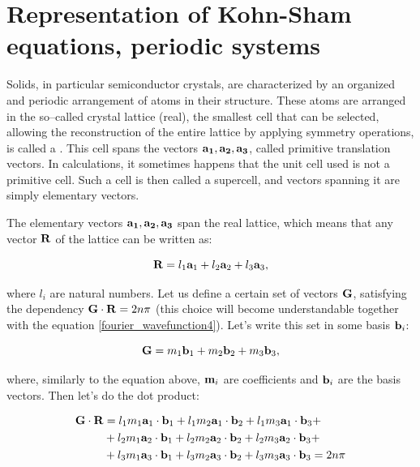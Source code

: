 \ornament

\section{Representation of Kohn-Sham equations, periodic systems}

Solids, in particular semiconductor crystals, are characterized by an organized and periodic arrangement of atoms in their structure.
These atoms are arranged in the so--called crystal lattice (real), the smallest cell that can be selected, allowing the reconstruction of the entire lattice by applying symmetry operations, is called a \prim.
This cell spans the vectors $\mathbf{a_1, a_2, a_3}$, called primitive translation vectors.
In calculations, it sometimes happens that the unit cell used is not a primitive cell.
Such a cell is then called a supercell, and vectors spanning it are simply elementary vectors.

The elementary vectors $\mathbf{a_1, a_2, a_3}$ span the real lattice, which means that any vector $\mathbf{R}$ of the lattice can be written as:

\begin{equation}
    \mathbf{R}=l_1\mathbf{a}_1+l_2\mathbf{a}_2+l_3\mathbf{a}_3,
    \label{real_lattice}
\end{equation}

where $l_i$ are natural numbers.
Let us define a certain set of vectors $\mathbf{G}$, satisfying the dependency $\mathbf{G} \cdot \mathbf{R}=2n\pi$ (this choice will become understandable together with the equation \ref{fourier_wavefunction4}).
Let's write this set in some basis $\mathbf{b}_i$:

\begin{equation}
    \mathbf{G}=m_1\mathbf{b}_1+m_2\mathbf{b}_2+m_3\mathbf{b}_3,
    \label{recip_lattice}
\end{equation}

where, similarly to the equation above, $\mathbf{m}_i$ are coefficients and $\mathbf{b}_i$ are the basis vectors.
Then let's do the dot product:

\begin{equation}
    \begin{aligned}
        \mathbf{G}\cdot\mathbf{R}&=l_1m_1\mathbf{a}_1\cdot \mathbf{b}_1+l_1m_2\mathbf{a}_1\cdot \mathbf{b}_2+l_1m_3\mathbf{a}_1\cdot \mathbf{b}_3+\\
        &+l_2m_1\mathbf{a}_2\cdot \mathbf{b}_1+l_2m_2\mathbf{a}_2\cdot \mathbf{b}_2+l_2m_3\mathbf{a}_2\cdot \mathbf{b}_3+\\
        &+l_3m_1\mathbf{a}_3\cdot \mathbf{b}_1+l_3m_2\mathbf{a}_3\cdot \mathbf{b}_2+l_3m_3\mathbf{a}_3\cdot \mathbf{b}_3=2n\pi
        \label{dot_prod}
    \end{aligned}
\end{equation}

